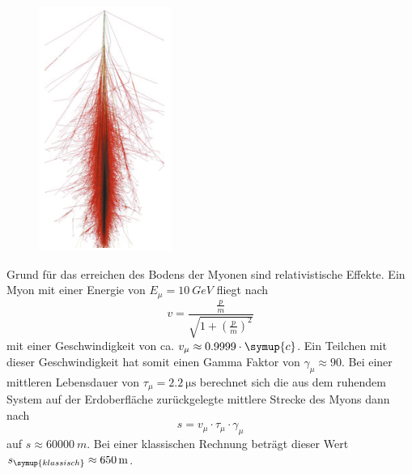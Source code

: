 \begin{figure}[H]
 \centering
 \includegraphics[width=0.2\linewidth]{data/Luftschauer.png}
 \label{fig:luftschauer}
\end{figure}
\noindent
Grund für das erreichen des Bodens der Myonen sind relativistische Effekte. Ein Myon mit einer Energie von $E_{\mu} = \SI{10}{GeV}$ fliegt nach 
\begin{equation}
    \label{eqn:t1}
    v = \frac{\frac{p}{m}}{\sqrt{1 + \left( \frac{p}{m} \right)^{2}}}
\end{equation}
mit einer Geschwindigkeit von ca. $v_{\mu} \approx 0.9999 \cdot \symup{c}$. Ein Teilchen mit dieser Geschwindigkeit hat somit einen Gamma Faktor von $\gamma_\mu \approx 90$. Bei einer mittleren Lebensdauer von $\tau_{\mu} = \SI{2.2}{\micro\second}$ berechnet sich die aus dem ruhendem System auf der Erdoberfläche zurückgelegte mittlere Strecke des Myons dann nach 
\begin{equation}
    \label{eqn:t2}
    s = v_{\mu} \cdot \tau_{\mu} \cdot \gamma_{\mu}
\end{equation}
auf $s \approx \SI{60000}{m}$. Bei einer klassischen Rechnung beträgt dieser Wert $s_{\symup{klassisch}} \approx \SI{650}{m}$.
